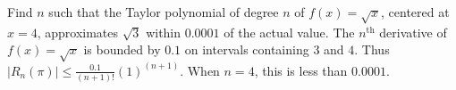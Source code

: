 {Find $n$ such that the  Taylor polynomial of degree $n$ of $f(x)= \sqrt x$, centered at $x=4$, approximates $\sqrt 3$ within $0.0001$ of the actual value.
}
{The $n^\text{th}$ derivative of $f(x)=\sqrt x$ is bounded by $0.1$ on intervals containing $3$ and $4$. Thus $|R_n(\pi)|\leq \frac{0.1}{(n+1)!}(1)^{(n+1)}$. When $n=4$, this is less than $0.0001$.
}